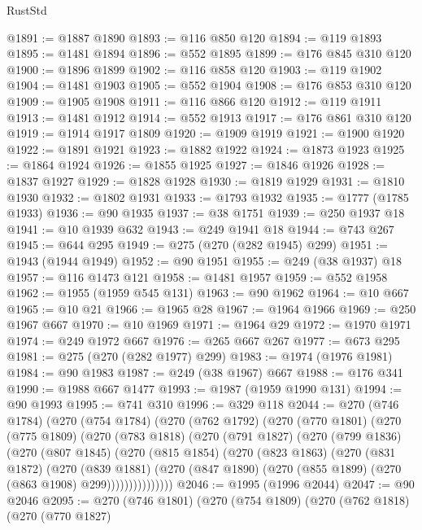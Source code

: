 \begin{lexlean}{RustStd}
\begin{coremodule}
@1891 := @1887 @1890
@1893 := @116 @850 @120
@1894 := @119 @1893
@1895 := @1481 @1894
@1896 := @552 @1895
@1899 := @176 @845 @310 @120
@1900 := @1896 @1899
@1902 := @116 @858 @120
@1903 := @119 @1902
@1904 := @1481 @1903
@1905 := @552 @1904
@1908 := @176 @853 @310 @120
@1909 := @1905 @1908
@1911 := @116 @866 @120
@1912 := @119 @1911
@1913 := @1481 @1912
@1914 := @552 @1913
@1917 := @176 @861 @310 @120
@1919 := @1914 @1917 @1809
@1920 := @1909 @1919
@1921 := @1900 @1920
@1922 := @1891 @1921
@1923 := @1882 @1922
@1924 := @1873 @1923
@1925 := @1864 @1924
@1926 := @1855 @1925
@1927 := @1846 @1926
@1928 := @1837 @1927
@1929 := @1828 @1928
@1930 := @1819 @1929
@1931 := @1810 @1930
@1932 := @1802 @1931
@1933 := @1793 @1932
@1935 := @1777 (@1785 @1933)
@1936 := @90 @1935
@1937 := @38 @1751
@1939 := @250 @1937 @18
@1941 := @10 @1939 @632
@1943 := @249 @1941 @18
@1944 := @743 @267
@1945 := @644 @295
@1949 := @275 (@270 (@282 @1945) @299)
@1951 := @1943 (@1944 @1949)
@1952 := @90 @1951
@1955 := @249 (@38 @1937) @18
@1957 := @116 @1473 @121
@1958 := @1481 @1957
@1959 := @552 @1958
@1962 := @1955 (@1959 @545 @131)
@1963 := @90 @1962
@1964 := @10 @667
@1965 := @10 @21
@1966 := @1965 @28
@1967 := @1964 @1966
@1969 := @250 @1967 @667
@1970 := @10 @1969
@1971 := @1964 @29
@1972 := @1970 @1971
@1974 := @249 @1972 @667
@1976 := @265 @667 @267
@1977 := @673 @295
@1981 := @275 (@270 (@282 @1977) @299)
@1983 := @1974 (@1976 @1981)
@1984 := @90 @1983
@1987 := @249 (@38 @1967) @667
@1988 := @176 @341
@1990 := @1988 @667 @1477
@1993 := @1987 (@1959 @1990 @131)
@1994 := @90 @1993
@1995 := @741 @310
@1996 := @329 @118
@2044 := @270
    (@746 @1784)
    (@270
      (@754 @1784)
      (@270
        (@762 @1792)
        (@270
          (@770 @1801)
          (@270
            (@775 @1809)
            (@270
              (@783 @1818)
              (@270
                (@791 @1827)
                (@270
                  (@799 @1836)
                  (@270
                    (@807 @1845)
                    (@270
                      (@815 @1854)
                      (@270
                        (@823 @1863)
                        (@270
                          (@831 @1872)
                          (@270
                            (@839 @1881)
                            (@270
                              (@847 @1890)
                              (@270 (@855 @1899) (@270 (@863 @1908) @299)))))))))))))))
@2046 := @1995 (@1996 @2044)
@2047 := @90 @2046
@2095 := @270
    (@746 @1801)
    (@270
      (@754 @1809)
      (@270
        (@762 @1818)
        (@270
          (@770 @1827)

\end{coremodule}
\end{lexlean}

